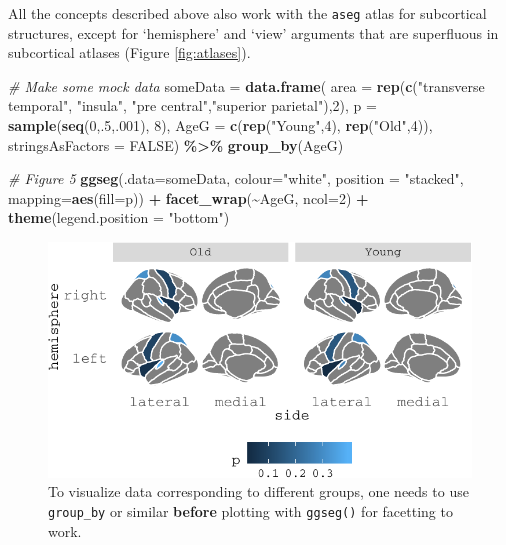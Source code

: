 \documentclass[fleqn,10pt]{wlpeerj} %
\newenvironment{Shaded}{\begin{snugshade}}{\end{snugshade}}
\newcommand{\CommentTok}[1]{\textcolor[rgb]{0.56,0.35,0.01}{\textit{#1}}}
\newcommand{\DataTypeTok}[1]{\textcolor[rgb]{0.13,0.29,0.53}{#1}}
\newcommand{\DecValTok}[1]{\textcolor[rgb]{0.00,0.00,0.81}{#1}}
\newcommand{\KeywordTok}[1]{\textcolor[rgb]{0.13,0.29,0.53}{\textbf{#1}}}
\newcommand{\NormalTok}[1]{#1}
\newcommand{\OperatorTok}[1]{\textcolor[rgb]{0.81,0.36,0.00}{\textbf{#1}}}
\newcommand{\OtherTok}[1]{\textcolor[rgb]{0.56,0.35,0.01}{#1}}
\newcommand{\StringTok}[1]{\textcolor[rgb]{0.31,0.60,0.02}{#1}}
\begin{document}
All the concepts described above also work with the \texttt{aseg} atlas for subcortical structures, except for `hemisphere' and `view' arguments that are superfluous in subcortical atlases (Figure \ref{fig:atlases}).

\begin{Shaded}
\begin{Highlighting}[]
\CommentTok{\# Make some mock data}
\NormalTok{someData =}\StringTok{ }\KeywordTok{data.frame}\NormalTok{(}
  \DataTypeTok{area =} \KeywordTok{rep}\NormalTok{(}\KeywordTok{c}\NormalTok{(}\StringTok{"transverse temporal"}\NormalTok{, }\StringTok{"insula"}\NormalTok{,}
               \StringTok{"pre central"}\NormalTok{,}\StringTok{"superior parietal"}\NormalTok{),}\DecValTok{2}\NormalTok{),}
  \DataTypeTok{p =} \KeywordTok{sample}\NormalTok{(}\KeywordTok{seq}\NormalTok{(}\DecValTok{0}\NormalTok{,.}\DecValTok{5}\NormalTok{,.}\DecValTok{001}\NormalTok{), }\DecValTok{8}\NormalTok{),}
  \DataTypeTok{AgeG =} \KeywordTok{c}\NormalTok{(}\KeywordTok{rep}\NormalTok{(}\StringTok{"Young"}\NormalTok{,}\DecValTok{4}\NormalTok{), }\KeywordTok{rep}\NormalTok{(}\StringTok{"Old"}\NormalTok{,}\DecValTok{4}\NormalTok{)),}
  \DataTypeTok{stringsAsFactors =} \OtherTok{FALSE}\NormalTok{) }\OperatorTok{\%>\%}
\StringTok{  }\KeywordTok{group\_by}\NormalTok{(AgeG)}

\CommentTok{\# Figure 5}
\KeywordTok{ggseg}\NormalTok{(}\DataTypeTok{.data=}\NormalTok{someData, }\DataTypeTok{colour=}\StringTok{"white"}\NormalTok{, }\DataTypeTok{position =} \StringTok{"stacked"}\NormalTok{,}
      \DataTypeTok{mapping=}\KeywordTok{aes}\NormalTok{(}\DataTypeTok{fill=}\NormalTok{p)) }\OperatorTok{+}
\StringTok{  }\KeywordTok{facet\_wrap}\NormalTok{(}\OperatorTok{\textasciitilde{}}\NormalTok{AgeG, }\DataTypeTok{ncol=}\DecValTok{2}\NormalTok{) }\OperatorTok{+}
\StringTok{  }\KeywordTok{theme}\NormalTok{(}\DataTypeTok{legend.position =} \StringTok{"bottom"}\NormalTok{)}
\end{Highlighting}
\end{Shaded}

\begin{figure}
\centering
\includegraphics{msc_ggseg_files/figure-latex/datasupp3-1.pdf}
\caption{\label{fig:datasupp3}To visualize data corresponding to different groups, one needs to use \texttt{group\_by} or similar \textbf{before} plotting with \texttt{ggseg()} for facetting to work.}
\end{figure}
\end{document}
